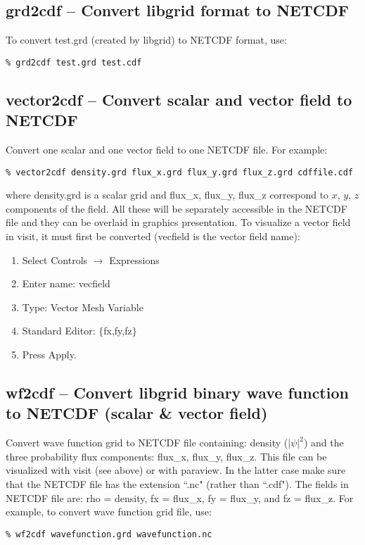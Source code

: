 \documentclass[12pt,letterpaper]{report}
\begin{document}
\subsection{grd2cdf -- Convert libgrid format to NETCDF}

To convert test.grd (created by libgrid) to NETCDF format, use:
\begin{verbatim}
% grd2cdf test.grd test.cdf
\end{verbatim}

\subsection{vector2cdf -- Convert scalar and vector field to NETCDF}

Convert one scalar and one vector field to one NETCDF file. For example:
\begin{verbatim}
% vector2cdf density.grd flux_x.grd flux_y.grd flux_z.grd cdffile.cdf
\end{verbatim}
where density.grd is a scalar grid and flux\_x, flux\_y, flux\_z correspond to $x$, $y$, $z$ components of the field. All these will be separately accessible in the NETCDF file and they can be overlaid in graphics presentation. To visualize a vector field in visit, it must first be converted (vecfield is the vector field name):
\begin{enumerate}
\item Select Controls $\rightarrow$ Expressions
\item Enter name: vecfield
\item Type: Vector Mesh Variable
\item Standard Editor: $\lbrace$fx,fy,fz$\rbrace$
\item Press Apply.
\end{enumerate}

\subsection{wf2cdf -- Convert libgrid binary wave function to NETCDF (scalar \& vector field)}

Convert wave function grid to NETCDF file containing: density ($|\psi|^2$) and the three probability flux components: flux\_x, flux\_y, flux\_z. This file can be visualized with visit (see above) or with paraview. In the latter case make sure that the NETCDF file has the extension ``.nc" (rather than ``.cdf"). The fields in NETCDF file are: rho = density, fx = flux\_x, fy = flux\_y, and fz = flux\_z. For example, to convert wave function grid file, use:
\begin{verbatim}
% wf2cdf wavefunction.grd wavefunction.nc
\end{verbatim}
\end{document}
